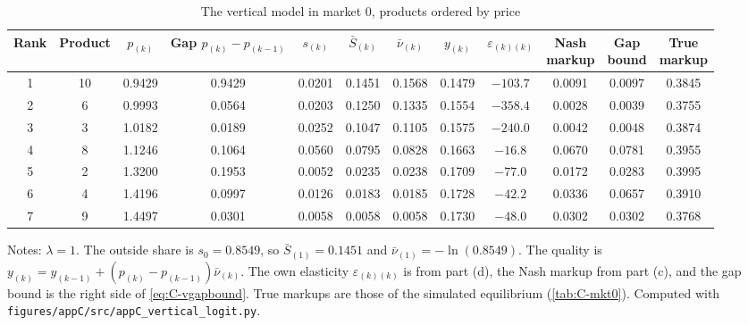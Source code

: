 \begin{table}[htbp]
\centering
\caption{The vertical model in market 0, products ordered by price}
\label{tab:C-vladder}
\footnotesize
\setlength{\tabcolsep}{3.5pt}
\begin{tabular}{@{}cccccccccccc@{}}
\toprule
Rank & Product & $p_{(k)}$ & \makecell{Gap\\ $p_{(k)} - p_{(k-1)}$} & $s_{(k)}$ & $\bar S_{(k)}$ & $\bar\nu_{(k)}$
 & $y_{(k)}$ & $\varepsilon_{(k)(k)}$ & \makecell{Nash\\ markup} & \makecell{Gap\\ bound} & \makecell{True\\ markup} \\
\midrule
1 & 10 & 0.9429 & 0.9429 & 0.0201 & 0.1451 & 0.1568 & 0.1479 & $-103.7$ & 0.0091 & 0.0097 & 0.3845 \\
2 & 6 & 0.9993 & 0.0564 & 0.0203 & 0.1250 & 0.1335 & 0.1554 & $-358.4$ & 0.0028 & 0.0039 & 0.3755 \\
3 & 3 & 1.0182 & 0.0189 & 0.0252 & 0.1047 & 0.1105 & 0.1575 & $-240.0$ & 0.0042 & 0.0048 & 0.3874 \\
4 & 8 & 1.1246 & 0.1064 & 0.0560 & 0.0795 & 0.0828 & 0.1663 & $-16.8$ & 0.0670 & 0.0781 & 0.3955 \\
5 & 2 & 1.3200 & 0.1953 & 0.0052 & 0.0235 & 0.0238 & 0.1709 & $-77.0$ & 0.0172 & 0.0283 & 0.3995 \\
6 & 4 & 1.4196 & 0.0997 & 0.0126 & 0.0183 & 0.0185 & 0.1728 & $-42.2$ & 0.0336 & 0.0657 & 0.3910 \\
7 & 9 & 1.4497 & 0.0301 & 0.0058 & 0.0058 & 0.0058 & 0.1730 & $-48.0$ & 0.0302 & 0.0302 & 0.3768 \\
\bottomrule
\end{tabular}

\vspace{3pt}
\begin{minipage}{0.97\textwidth}
\footnotesize Notes: $\lambda = 1$. The outside share is $s_0 = 0.8549$, so $\bar S_{(1)} = 0.1451$
and $\bar\nu_{(1)} = -\ln(0.8549)$. The quality is $y_{(k)} = y_{(k-1)} + (p_{(k)} - p_{(k-1)})\bar\nu_{(k)}$. The own
elasticity $\varepsilon_{(k)(k)}$ is from part (d), the Nash markup from part (c), and the gap bound is the right side of
\eqref{eq:C-vgapbound}. True markups are those of the simulated equilibrium (\cref{tab:C-mkt0}).
Computed with \texttt{figures/appC/src/appC\_vertical\_logit.py}.
\end{minipage}
\end{table}


